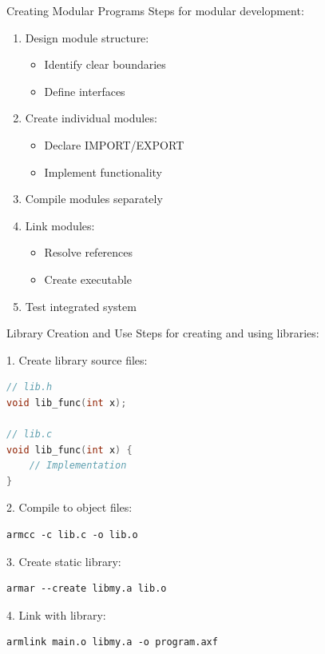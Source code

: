 \begin{KR}{Creating Modular Programs}
Steps for modular development:
\begin{enumerate}
  \item Design module structure:
    \begin{itemize}
      \item Identify clear boundaries
      \item Define interfaces
    \end{itemize}
  \item Create individual modules:
    \begin{itemize}
      \item Declare IMPORT/EXPORT
      \item Implement functionality
    \end{itemize}
  \item Compile modules separately
  \item Link modules:
    \begin{itemize}
      \item Resolve references
      \item Create executable
    \end{itemize}
  \item Test integrated system
\end{enumerate}
\end{KR}

\begin{KR}{Library Creation and Use}
Steps for creating and using libraries:

1. Create library source files:
\begin{lstlisting}[language=C, style=basesmol]
// lib.h
void lib_func(int x);

// lib.c
void lib_func(int x) {
    // Implementation
}
\end{lstlisting}

2. Compile to object files:
\begin{lstlisting}[style=basesmol]
armcc -c lib.c -o lib.o
\end{lstlisting}

3. Create static library:
\begin{lstlisting}[style=basesmol]
armar --create libmy.a lib.o
\end{lstlisting}

4. Link with library:
\begin{lstlisting}[style=basesmol]
armlink main.o libmy.a -o program.axf
\end{lstlisting}
\end{KR}

